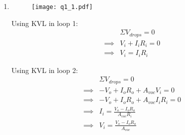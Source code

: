 \def \Rs{50 		\times 10^3}
\def \RL{400}
\def \Rione{1		\times 10^6}
\def \Roone{1		\times 10^3}
\def \Ritwo{200		\times 10^3}
\def \Rotwo{2		\times 10^3}
\def \Rithree{25	\times 10^3}
\def \Rothree{50}
\def \Aone{10}
\def \Atwo{100}
\def \Athree{2}

\def \Aoneone{542.7		\times 10^{-6}}
\def \Aonetwo{27.135	\times 10^{-3}}
\def \Atwoone{542.7		\times 10^{-12}}
\def \Atwotwo{27.135 	\times 10^{-9}}

\def \Gtot{1559.9}

\begin{enumerate}
	
	\item{
	\text{}
	
	\begin{figure}[H]
	\begin{center}
	\texttt{[image: q1\_1.pdf]}
	\end{center}
	\end{figure}
	
	Using KVL in loop 1:
	\begin{align*}
	&\Sigma V_{drops} = 0
	\\
	\implies & V_i + I_i R_i =0
	\\
	\implies & V_i = I_i R_i
	\end{align*}		
	
	Using KVL in loop 2:
	\begin{align*}
	&\Sigma V_{drops} = 0
	\\
	\implies & -V_o + I_o R_o + A_{voc}V_i = 0
	\\
	\implies & -V_o + I_o R_o + A_{voc}I_i R_i = 0
	\\
	\implies & I_i = \frac{V_o - I_o R_o}{A_{voc}R_i}
	\\
	\implies & V_i = \frac{V_o - I_o R_o}{A_{voc}}
	\end{align*}		
	
}
\end{enumerate}
